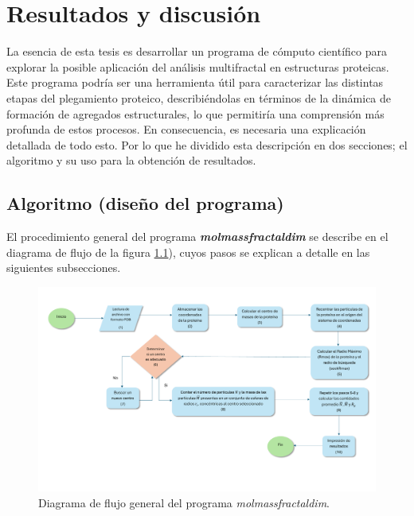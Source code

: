 \chapter{Resultados y discusión}

La esencia de esta tesis es desarrollar un programa de cómputo científico para explorar la posible aplicación del análisis multifractal en estructuras proteicas. Este programa podría ser una herramienta útil para caracterizar las distintas etapas del plegamiento proteico, describiéndolas en términos de la dinámica de formación de agregados estructurales, lo que permitiría una comprensión más profunda de estos procesos. En consecuencia, es necesaria una explicación detallada de todo esto. Por lo que he dividido esta descripción en dos secciones; el algoritmo y su uso para la obtención de resultados. 
 
 \clearpage
 
\section{Algoritmo (diseño del programa)}

 El procedimiento general del programa \textbf{\textit{molmassfractaldim}} se describe en el diagrama de flujo de la figura \ref{dfMolFractalDim}), cuyos pasos se explican a detalle en las siguientes subsecciones.
 
 
 \begin{figure}[h!]
 	\begin{center}
 		\includegraphics[width=\textwidth]{graphs/dfMolFractalDim}
 		\caption{Diagrama de flujo general del programa \textit{molmassfractaldim}.}
 		\label{dfMolFractalDim}
 	\end{center}
 \end{figure}
 

